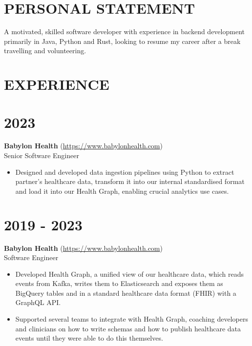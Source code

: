 \documentclass[margin]{res}
\begin{document}
\begin{resume}

\section{PERSONAL STATEMENT}

A motivated, skilled software developer with experience in backend development primarily in Java, Python and Rust, looking to resume my career after a break travelling and volunteering.

\section{EXPERIENCE}

\normalsize{\section{2023}}
{\bf Babylon Health} (\href{https://www.babylonhealth.com/}{https://www.babylonhealth.com}) \\
Senior Software Engineer

\begin{itemize}

\item
Designed and developed data ingestion pipelines using Python to extract partner's healthcare data, transform it into our internal standardised format and load it into our Health Graph, enabling crucial analytics use cases.

\end{itemize}

\normalsize{\section{2019 - 2023}}
{\bf Babylon Health} (\href{https://www.babylonhealth.com/}{https://www.babylonhealth.com}) \\
Software Engineer
\begin{itemize}

\item
Developed Health Graph, a unified view of our healthcare data, which reads events from Kafka, writes them to Elasticsearch and exposes them as BigQuery tables and in a standard healthcare data format (FHIR) with a GraphQL API.

\item
Supported several teams to integrate with Health Graph, coaching developers and clinicians on how to write schemas and how to publish healthcare data events until they were able to do this themselves.


\end{itemize}
\end{resume}
\end{document}
